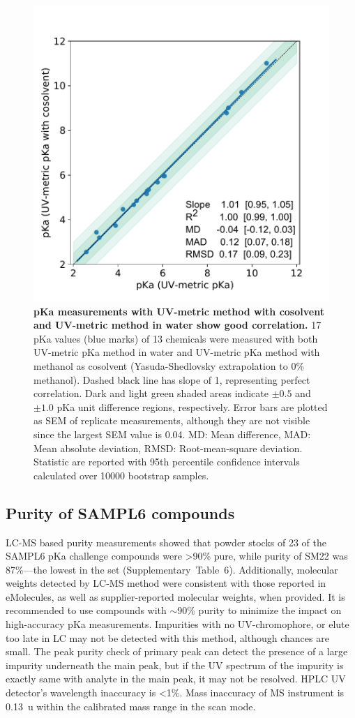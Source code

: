 \documentclass[9pt,lineno]{elife}
\begin{document}
\begin{figure}
\begin{center}
\includegraphics[width=0.5\linewidth]{figures/water_vs_cosolvent_pKa_values_correlation_plot.pdf}
\caption{{\bf pKa measurements with UV-metric method with cosolvent and UV-metric method in water show good correlation.} 
17 pKa values (blue marks) of 13 chemicals were measured with both UV-metric pKa method in water and UV-metric pKa method with methanol as cosolvent (Yasuda-Shedlovsky extrapolation to 0\% methanol). Dashed black line has slope of 1, representing perfect correlation.  Dark and light green shaded areas indicate $\pm 0.5$ and $\pm 1.0$ pKa unit difference regions, respectively. Error bars are plotted as SEM of replicate measurements, although they are not visible since the largest SEM value is 0.04. MD: Mean difference, MAD: Mean absolute deviation, RMSD: Root-mean-square deviation.  Statistic are reported with 95th percentile confidence intervals calculated over 10000 bootstrap samples.
}
\label{fig:water_vs_cosolvent_pKa_correlation}
\end{center}
\end{figure}

\subsection{Purity of SAMPL6 compounds}
LC-MS based purity measurements showed that powder stocks of 23 of the SAMPL6 pKa challenge compounds were >90\% pure, while purity of SM22 was 87\%---the lowest in the set (Supplementary~Table~6).  
Additionally, molecular weights detected by LC-MS method were consistent with those reported in eMolecules, as well as supplier-reported molecular weights, when provided. 
 It is recommended to use compounds with $\sim$90\% purity to minimize the impact on high-accuracy pKa measurements. 
Impurities with no UV-chromophore, or elute too late in LC may not be detected with this method, although chances are small. The peak purity check of primary peak can detect the presence of a large impurity underneath the main peak, but if the UV spectrum of the impurity is exactly same with analyte in the main peak, it may not be resolved. HPLC UV detector's wavelength inaccuracy is <1\%. Mass inaccuracy of MS instrument is 0.13~u within the calibrated mass range in the scan mode. 
\end{document}
